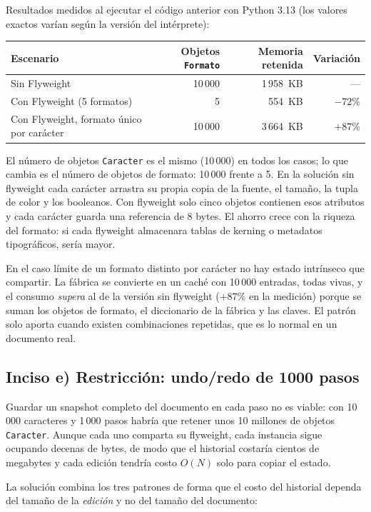 Resultados medidos al ejecutar el código anterior con Python 3.13 (los valores exactos varían según la versión del intérprete):

\begin{center}
\begin{tabular}{lrrr}
\toprule
Escenario & Objetos \texttt{Formato} & Memoria retenida & Variación \\
\midrule
Sin Flyweight & 10\,000 & 1\,958~KB & --- \\
Con Flyweight (5 formatos) & 5 & 554~KB & \(-72\%\) \\
Con Flyweight, formato único por carácter & 10\,000 & 3\,664~KB & \(+87\%\) \\
\bottomrule
\end{tabular}
\end{center}

El número de objetos \texttt{Caracter} es el mismo (10\,000) en todos los casos; lo que cambia es el número de objetos de formato: 10\,000 frente a 5. En la solución sin flyweight cada carácter arrastra su propia copia de la fuente, el tamaño, la tupla de color y los booleanos. Con flyweight solo cinco objetos contienen esos atributos y cada carácter guarda una referencia de 8 bytes. El ahorro crece con la riqueza del formato: si cada flyweight almacenara tablas de kerning o metadatos tipográficos, sería mayor.

En el caso límite de un formato distinto por carácter no hay estado intrínseco que compartir. La fábrica se convierte en un caché con 10\,000 entradas, todas vivas, y el consumo \emph{supera} al de la versión sin flyweight (\(+87\%\) en la medición) porque se suman los objetos de formato, el diccionario de la fábrica y las claves. El patrón solo aporta cuando existen combinaciones repetidas, que es lo normal en un documento real.

\subsection{Inciso e) Restricción: undo/redo de 1000 pasos}

Guardar un snapshot completo del documento en cada paso no es viable: con 10\,000 caracteres y 1\,000 pasos habría que retener unos 10 millones de objetos \texttt{Caracter}. Aunque cada uno comparta su flyweight, cada instancia sigue ocupando decenas de bytes, de modo que el historial costaría cientos de megabytes y cada edición tendría costo \(O(N)\) solo para copiar el estado.

La solución combina los tres patrones de forma que el costo del historial dependa del tamaño de la \emph{edición} y no del tamaño del documento:


